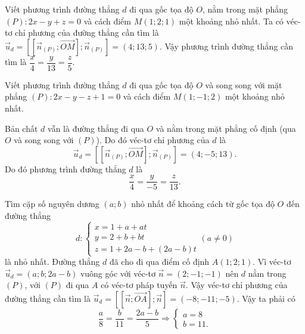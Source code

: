 \begin{vd}%
Viết phương trình đường thẳng $d$ đi qua gốc tọa độ $O$, nằm trong mặt phẳng $(P): 2x-y+z=0$ và cách điểm $M(1;2;1)$ một khoảng nhỏ nhất.
\loigiai
{
Ta có véc-tơ chỉ phương của đường thẳng cần tìm là $\vec{u}_d=\left[\left[\vec{n}_{(P)};\vec{OM}\right]; \vec{n}_{(P)}\right]=(4;13;5)$. Vậy phương trình đường thẳng cần tìm là $\dfrac{x}{4}=\dfrac{y}{13}=\dfrac{z}{5}$.
}
\end{vd} 
\begin{vd}%
Viết phương trình đường thẳng $d$ đi qua gốc tọa độ $O$ và song song với mặt phẳng \mbox{$(P): 2x-y-z+1=0$} và cách điểm $M(1;-1;2)$ một khoảng nhỏ nhất.
\loigiai
{
Bản chất $d$ vẫn là đường thẳng đi qua $O$ và nằm trong mặt phẳng cố định (qua $O$ và song song với $(P)$). Do đó véc-tơ chỉ phương của $d$ là
\[\vec{u}_d=\left[\left[\vec{n}_{(P)};\vec{OM}\right];\vec{n}_{(P)}\right]=(4;-5;13).\] Do đó phương trình đường thẳng $d$ là \[\dfrac{x}{4}=\dfrac{y}{-5}=\dfrac{z}{13}.\] 

}
\end{vd} 
\begin{vd}%
Tìm cặp số nguyên dương $(a;b)$ nhỏ nhất để khoảng cách từ gốc tọa độ $O$ đến đường thẳng 
\[d:\begin{cases}
x=1+a+at\\
y=2+b+bt\\
z=1+2a-b+(2a-b)t
\end{cases} (a\ne0)\]
là nhỏ nhất.
\loigiai
{
Đường thẳng $d$ đã cho đi qua điểm cố định $A(1;2;1)$. Vì véc-tơ  $\vec{u}_d=(a;b;2a-b)$ vuông góc với véc-tơ $\vec{n}=(2;-1;-1)$ nên $d$ nằm trong $(P)$, với $(P)$ đi qua $A$ có véc-tơ pháp tuyến $\vec{n}$. Vậy véc-tơ chỉ phương của đường thẳng cần tìm là $\vec{u}_d=\left[\left[\vec{n};\vec{OA}\right];\vec{n}\right]=(-8;-11;-5)$. Vậy ta phải có
\[\dfrac{a}{8}=\dfrac{b}{11}=\dfrac{2a-b}{5}\Rightarrow \begin{cases}
a=8\\
b=11.
\end{cases}\]
}
\end{vd} 
